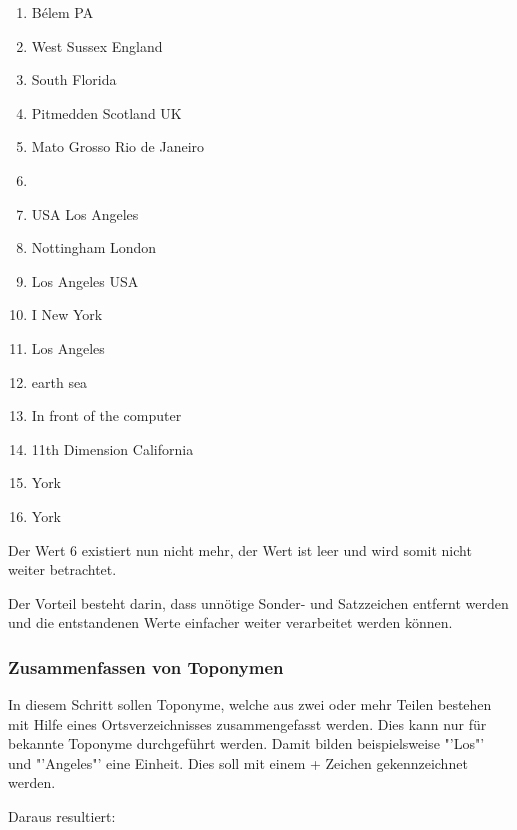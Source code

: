 				\begin{multicols}{2}
					\begin{enumerate}
						\item Bélem PA
						\item West Sussex England
						\item South Florida
						\item Pitmedden Scotland UK
						\item Mato Grosso Rio de Janeiro
						\item 
						\item USA Los Angeles
						\item Nottingham London
						\item Los Angeles USA
						\item I New York 
						\item Los Angeles
						\item earth sea
						\item In front of the computer
						\item 11th Dimension California
						\item York
						\item York
					\end{enumerate}
				\end{multicols}

				Der Wert 6 existiert nun nicht mehr, der Wert ist leer und wird somit nicht weiter betrachtet.

				Der Vorteil besteht darin, dass unnötige Sonder- und Satzzeichen entfernt werden und die entstandenen Werte einfacher weiter verarbeitet werden können.

			\subsubsection{Zusammenfassen von Toponymen}

				In diesem Schritt sollen Toponyme, welche aus zwei oder mehr Teilen bestehen mit Hilfe eines Ortsverzeichnisses zusammengefasst werden. 
				Dies kann nur für bekannte Toponyme durchgeführt werden.
				Damit bilden beispielsweise "'Los"' und "'Angeles"' eine Einheit. 
				Dies soll mit einem + Zeichen gekennzeichnet werden.

				Daraus resultiert:

